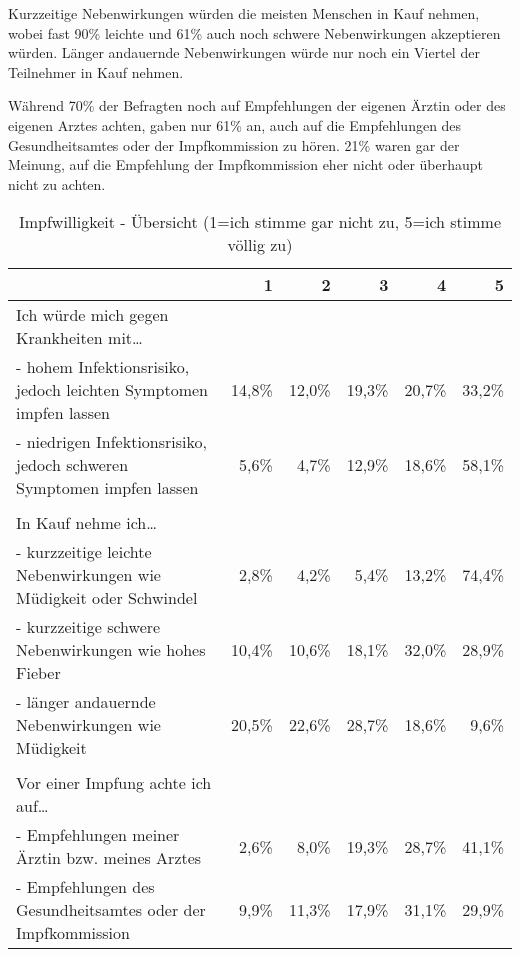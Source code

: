 Kurzzeitige Nebenwirkungen würden die meisten Menschen in Kauf nehmen, wobei fast 90\% leichte und 61\% auch noch schwere Nebenwirkungen akzeptieren würden. Länger andauernde Nebenwirkungen würde nur noch ein Viertel der Teilnehmer in Kauf nehmen.

Während 70\% der Befragten noch auf Empfehlungen der eigenen Ärztin oder des eigenen Arztes achten, gaben nur 61\% an, auch auf die Empfehlungen des Gesundheitsamtes oder der Impfkommission zu hören. 21\% waren gar der Meinung, auf die Empfehlung der Impfkommission eher nicht oder überhaupt nicht zu achten.

\begin{table}[h!]
    \centering
    \begin{tabular} {p{7.5cm} r r r r r}
        & 1 & 2 & 3 & 4 & 5 \\
        \hline
        Ich würde mich gegen Krankheiten mit\ldots & & & & & \\
        - hohem Infektionsrisiko, jedoch leichten Symptomen impfen lassen & 14,8\% & 12,0\% & 19,3\% & 20,7\% & 33,2\% \\

        - niedrigen Infektionsrisiko, jedoch schweren Symptomen impfen lassen & 5,6\% & 4,7\% & 12,9\% & 18,6\% & 58,1\% \\

        \\

        In Kauf nehme ich\ldots & & & & & \\

        - kurzzeitige leichte Nebenwirkungen wie Müdigkeit oder Schwindel & 2,8\% & 4,2\% & 5,4\% & 13,2\% & 74,4\% \\

        - kurzzeitige schwere Nebenwirkungen wie hohes Fieber & 10,4\% & 10,6\% & 18,1\% & 32,0\% & 28,9\% \\

        - länger andauernde Nebenwirkungen wie Müdigkeit & 20,5\% & 22,6\% & 28,7\% & 18,6\% & 9,6\% \\

        \\

        Vor einer Impfung achte ich auf\ldots & & & & & \\

        - Empfehlungen meiner Ärztin bzw. meines Arztes & 2,6\% & 8,0\% & 19,3\% & 28,7\% & 41,1\% \\

        - Empfehlungen des Gesundheitsamtes oder der Impfkommission & 9,9\% & 11,3\% & 17,9\% & 31,1\% & 29,9\% \\
    \end{tabular}
    \caption{Impfwilligkeit - Übersicht (1=ich stimme gar nicht zu, 5=ich stimme völlig zu)}
    \label{tab:impfwilligkeit}
\end{table}

